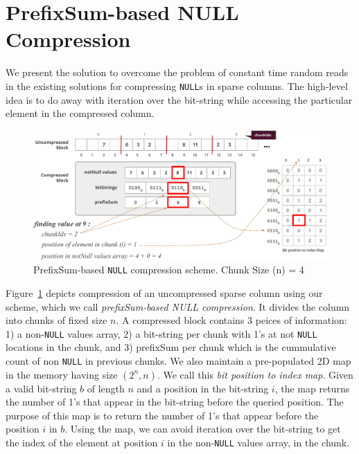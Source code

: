 \section{PrefixSum-based NULL Compression}
\label{sec:prefixbased}

We present the solution to overcome the problem of constant time random reads in the existing solutions for compressing \texttt{NULL}s in sparse columns. The high-level idea is to do away with iteration over the bit-string while accessing the particular element in the compressed column.

\begin{figure}
	\vspace{-20pt}
	\hfill\includegraphics[scale=0.70]{img/null2}\hspace*{\fill}
	\captionsetup{justification=centering}
	\caption{PrefixSum-based \texttt{NULL} compression scheme. Chunk Size (n) = 4}
	\label{fig:null2}
	\vspace{-2pt}
\end{figure}

Figure~\ref{fig:null2} depicts compression of an uncompressed sparse column using our scheme, which we call \emph{prefixSum-based NULL compression}. It divides the column into chunks of fixed size $n$. A compressed block contains 3 peices of information: 1) a non-\texttt{NULL} values array, 2) a bit-string per chunk with 1's at not \texttt{NULL} locations in the chunk, and 3) prefixSum per chunk which is the cummulative count of non \texttt{NULL} in previous chunks. We also maintain a pre-populated 2D map in the memory having size $(2^n, n)$. We call this \emph{bit position to index map}. Given a valid bit-string $b$ of length $n$ and a position in the bit-string $i$, the map returns the number of 1's that appear in the bit-string before the queried position. The purpose of this map is to return the number of 1's that appear before the position $i$ in $b$. Using the map, we can avoid iteration over the bit-string to get the index of the element at position $i$ in the non-\texttt{NULL} values array, in the chunk.



















